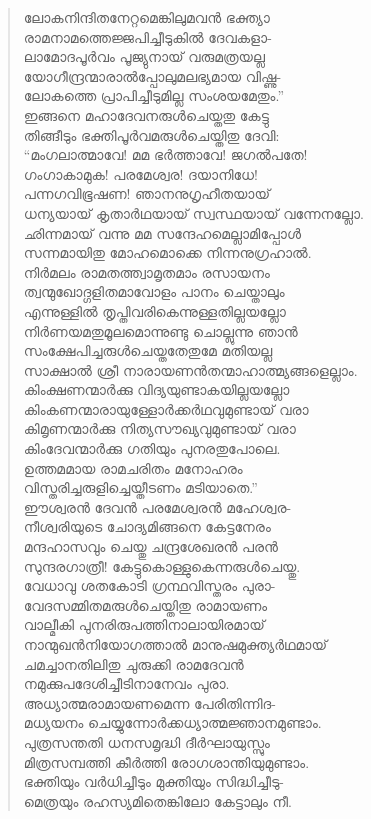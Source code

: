 \begin{verse}
ലോകനിന്ദിതനേറ്റമെങ്കിലുമവന്‍ ഭക്ത്യാ\\
രാമനാമത്തെജ്ജപിച്ചീടുകില്‍ ദേവകളാ-\\
ലാമോദപൂര്‍വം പൂജ്യുനായ് വരുമത്രയല്ല\\
യോഗീന്ദ്രന്മാരാല്‍പ്പോലുമലഭ്യമായ വിഷ്ണു-\\
ലോകത്തെ പ്രാപിച്ചീടുമില്ല സംശയമേതും.”\\
ഇങ്ങനെ മഹാദേവനരുള്‍ചെയ്തതു കേട്ടു\\
തിങ്ങീടും ഭക്തിപൂര്‍വമരുള്‍ചെയ്തിതു ദേവി:\\
“മംഗലാത്മാവേ! മമ ഭര്‍ത്താവേ! ജഗല്‍പതേ!\\
ഗംഗാകാമുക! പരമേശ്വര! ദയാനിധേ!\\
പന്നഗവിഭൂഷണ! ഞാനനുഗൃഹീതയായ്\\
ധന്യയായ് കൃതാര്‍ഥയായ് സ്വസ്ഥയായ് വന്നേനല്ലോ.\\
ഛിന്നമായ് വന്നു മമ സന്ദേഹമെല്ലാമിപ്പോള്‍\\
സന്നമായിതു മോഹമൊക്കെ നിന്നനുഗ്രഹാല്‍.\\
നിര്‍മലം രാമതത്ത്വാമൃതമാം രസായനം\\
ത്വന്മുഖോദ്ഗളിതമാവോളം പാനം ചെയ്താലും\\
എന്നുള്ളില്‍ തൃപ്തിവരികെന്നുള്ളതില്ലയല്ലോ\\
നിര്‍ണയമതുമൂലമൊന്നുണ്ടു ചൊല്ലുന്നു ഞാന്‍\\
സംക്ഷേപിച്ചരുള്‍ചെയ്തതേതുമേ മതിയല്ല\\
സാക്ഷാല്‍ ശ്രീ നാരായണന്‍തന്മാഹാത്മ്യങ്ങളെല്ലാം.\\
കിംക്ഷണന്മാര്‍ക്കു വിദ്യയുണ്ടാകയില്ലയല്ലോ\\
കിംകണന്മാരായുള്ളോര്‍ക്കര്‍ഥവുമുണ്ടായ് വരാ\\
കിമൃണന്മാര്‍ക്കു നിത്യസൗഖ്യവുമുണ്ടായ് വരാ\\
കിംദേവന്മാര്‍ക്കു ഗതിയും പുനരതുപോലെ.\\
ഉത്തമമായ രാമചരിതം മനോഹരം\\
വിസ്തരിച്ചരുളിച്ചെയ്തീടണം മടിയാതെ.”\\
ഈശ്വരന്‍ ദേവന്‍ പരമേശ്വരന്‍ മഹേശ്വര-\\
നീശ്വരിയുടെ ചോദ്യമിങ്ങനെ കേട്ടനേരം\\
മന്ദഹാസവും ചെയ്തു ചന്ദ്രശേഖരന്‍ പരന്‍\\
സുന്ദരഗാത്രീ! കേട്ടുകൊള്ളുകെന്നരുള്‍ചെയ്തു.\\
വേധാവു ശതകോടി ഗ്രന്ഥവിസ്തരം പുരാ-\\
വേദസമ്മിതമരുള്‍ചെയ്തിതു രാമായണം\\
വാല്മീകി പുനരിരുപത്തിനാലായിരമായ്\\
നാന്മുഖന്‍നിയോഗത്താല്‍ മാനുഷമുക്ത്യര്‍ഥമായ്\\
ചമച്ചാനതിലിതു ചുരുക്കി രാമദേവന്‍\\
നമുക്കുപദേശിച്ചീടിനാനേവം പുരാ.\\
അധ്യാത്മരാമായണമെന്ന പേരിതിന്നിദ-\\
മധ്യയനം ചെയ്യുന്നോര്‍ക്കധ്യാത്മജ്ഞാനമുണ്ടാം.\\
പുത്രസന്തതി ധനസമൃദ്ധി ദീര്‍ഘായുസ്സും\\
മിത്രസമ്പത്തി കീര്‍ത്തി രോഗശാന്തിയുമുണ്ടാം.\\
ഭക്തിയും വര്‍ധിച്ചീടും മുക്തിയും സിദ്ധിച്ചീടു-\\
മെത്രയും രഹസ്യമിതെങ്കിലോ കേട്ടാലും നീ.
\end{verse}

